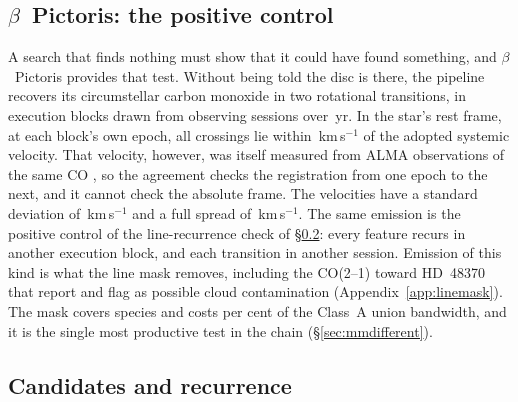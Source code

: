 \subsection{$\beta$~Pictoris: the positive control}
\label{sec:bpicval}

A search that finds nothing must show that it could have found something,
and $\beta$~Pictoris provides that test. Without being told the disc is
there, the pipeline recovers its circumstellar carbon monoxide
\citep{Dent2014,Matra2017} in two rotational transitions, in
\CsBpCoBlocks{} execution blocks drawn from \CsBpCoSess{} observing sessions
over \BpBaselineYr\,yr. In the star's rest frame, at each block's own epoch,
all \BpicPanelNCo{} crossings lie within \BpicDvCoHi\,km\,s$^{-1}$ of the
adopted systemic velocity. That velocity, however, was itself measured from
ALMA observations of the same CO \citep{Matra2017}, so the agreement checks
the registration from one epoch to the next, and it cannot check the
absolute frame.
The \LrBpNVel{} velocities have a standard deviation of
\LrBpDvSd\,km\,s$^{-1}$ and a full spread of \LrBpDvRange\,km\,s$^{-1}$. The same emission is the positive control of the
line-recurrence check of \S\ref{sec:etacrv}: every feature recurs in another
execution block, and each transition in another session. Emission of this
kind is what the line mask removes, including the CO(2--1) toward
HD~48370 that \citet{Cataldi2023} report and flag as possible cloud
contamination (Appendix~\ref{app:linemask}). The mask covers \FrNSpec{}
species and costs \MkMaskAPct{} per cent of the Class~A union bandwidth, and
it is the single most productive test in the chain
(\S\ref{sec:mmdifferent}).

\subsection{Candidates and recurrence}
\label{sec:etacrv}

